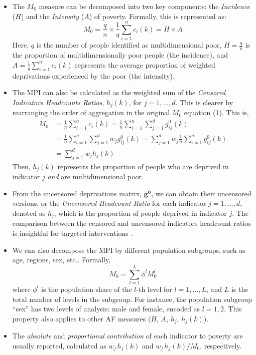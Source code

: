 \begin{itemize}
\item
  The \(M_0\) measure can be decomposed into two key components: the \emph{Incidence} (\(H\)) and the \emph{Intensity} (\(A\)) of poverty. Formally, this is represented as: \[M_0 = \frac{q}{n} \times \frac{1}{q}\sum_{i=1}^n c_i(k) = H \times A \] Here, \(q\) is the number of people identified as multidimensional poor, \(H=\frac{q}{n}\) is the proportion of multidimensionally poor people (the incidence), and \(A= \frac{1}{q}\sum_{i=1}^n c_i(k)\) represents the average proportion of weighted deprivations experienced by the poor (the intensity).
\item
  The MPI can also be calculated as the weighted sum of the \emph{Censored Indicators Headcounts Ratios}, \(h_j(k)\), for \(j=1,\ldots,d\). This is clearer by rearranging the order of aggregation in the original \(M_0\) equation (1). This is, \begin{align}
  M_0 &= \frac{1}{n} \sum_{i=1}^n c_i(k) = \frac{1}{n} \sum_{i=1}^n \sum_{j=1}^d \bar{g}^0_{ij}(k) \\ &= \frac{1}{n} \sum_{i=1}^n \sum_{j=1}^d w_j g^0_{ij}(k)  = \sum_{j=1}^d w_j \frac{1}{n} \sum_{i=1}^n g^0_{ij}(k)  \\ &= \sum_{j=1}^d w_j h_j(k)
  \end{align}
  Then, \(h_j(k)\) represents the proportion of people who are deprived in indicator \(j\) \emph{and} are multidimensional poor.
\item
  From the uncensored deprivations matrix, \(\mathbf{g^0}\), we can obtain their uncensored versions, or the \emph{Uncensored Headcount Ratio} for each indicator \(j=1,\dots,d\), denoted as \(h_j\), which is the proportion of people deprived in indicator \(j\). The comparison between the censored and uncensored indicators headcount ratios is insightful for targeted interventions \citep{MPIpolicytool}.
\item
  We can also decompose the MPI by different population subgroups, such as age, regions, sex, etc.. Formally,
  \[ M_0 = \sum_{l=1}^L \phi^l M_0^l\] where \(\phi^l\) is the population share of the \(l\)-th level for \(l =1, \ldots, L\), and \(L\) is the total number of levels in the subgroup. For instance, the population subgroup ``sex'' has two levels of analysis: male and female, encoded as \(l=1,2\). This property also applies to other AF measures (\(H\), \(A\), \(h_j\), \(h_j(k)\)).
\item
  The \emph{absolute} and \emph{proportional} \emph{contribution} of each indicator to poverty are usually reported, calculated as \(w_j \, h_j(k)\) and \(w_j \, h_j(k)/M_0\), respectively.
\end{itemize}

